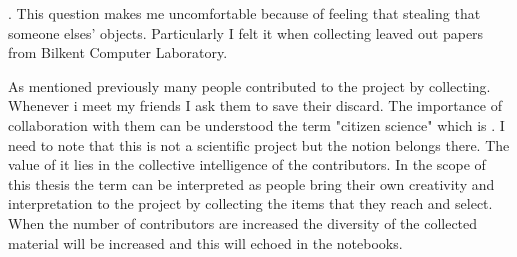 
 \cite{zimring2012encyclopedia}. This question makes me uncomfortable because of feeling that stealing that someone elses' objects. Particularly I felt it when collecting leaved out papers from Bilkent Computer Laboratory.





As mentioned previously many people contributed to the project by collecting. Whenever i meet my friends I ask them to save their discard. The importance of collaboration with them can be understood the term "citizen science" which is  \citep{robson2012using}. I need to note that this is not a scientific project but the notion belongs there. The value of it lies in the collective intelligence of the contributors. In the scope of this thesis the term can be interpreted as people bring their own creativity and interpretation to the project by collecting the items that they reach and select. When the number of contributors are increased the diversity of the collected material will be increased and this will echoed in the notebooks. 

